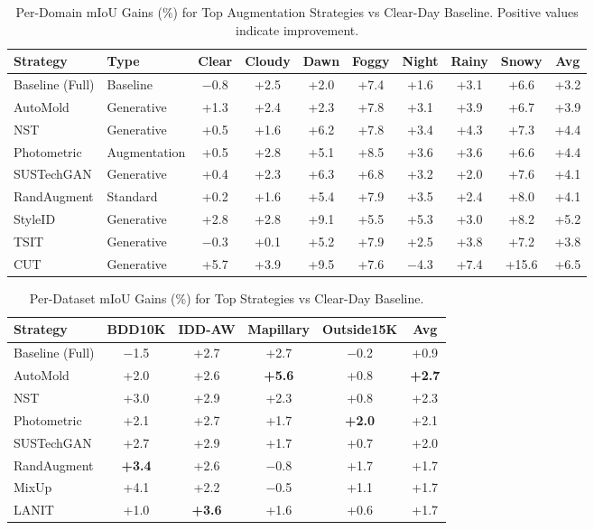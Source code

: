 \begin{table}[t]
\centering
\caption{Per-Domain mIoU Gains (\%) for Top Augmentation Strategies vs Clear-Day Baseline. Positive values indicate improvement.}
\label{tab:per_domain_gains}
\begin{tabular}{@{}llccccccc|c@{}}
\toprule
\textbf{Strategy} & \textbf{Type} & \textbf{Clear} & \textbf{Cloudy} & \textbf{Dawn} & \textbf{Foggy} & \textbf{Night} & \textbf{Rainy} & \textbf{Snowy} & \textbf{Avg} \\
\midrule
Baseline (Full) & Baseline & $-$0.8 & +2.5 & +2.0 & +7.4 & +1.6 & +3.1 & +6.6 & +3.2 \\
AutoMold & Generative & +1.3 & +2.4 & +2.3 & +7.8 & +3.1 & +3.9 & +6.7 & +3.9 \\
NST & Generative & +0.5 & +1.6 & +6.2 & +7.8 & +3.4 & +4.3 & +7.3 & +4.4 \\
Photometric & Augmentation & +0.5 & +2.8 & +5.1 & +8.5 & +3.6 & +3.6 & +6.6 & +4.4 \\
SUSTechGAN & Generative & +0.4 & +2.3 & +6.3 & +6.8 & +3.2 & +2.0 & +7.6 & +4.1 \\
RandAugment & Standard & +0.2 & +1.6 & +5.4 & +7.9 & +3.5 & +2.4 & +8.0 & +4.1 \\
StyleID & Generative & +2.8 & +2.8 & +9.1 & +5.5 & +5.3 & +3.0 & +8.2 & +5.2 \\
TSIT & Generative & $-$0.3 & +0.1 & +5.2 & +7.9 & +2.5 & +3.8 & +7.2 & +3.8 \\
CUT & Generative & +5.7 & +3.9 & +9.5 & +7.6 & $-$4.3 & +7.4 & +15.6 & +6.5 \\
\bottomrule
\end{tabular}
\end{table}



\begin{table}[t]
\centering
\caption{Per-Dataset mIoU Gains (\%) for Top Strategies vs Clear-Day Baseline.}
\label{tab:per_dataset_gains}
\begin{tabular}{@{}lcccc|c@{}}
\toprule
\textbf{Strategy} & \textbf{BDD10K} & \textbf{IDD-AW} & \textbf{Mapillary} & \textbf{Outside15K} & \textbf{Avg} \\
\midrule
Baseline (Full) & $-$1.5 & +2.7 & +2.7 & $-$0.2 & +0.9 \\
AutoMold & +2.0 & +2.6 & \textbf{+5.6} & +0.8 & \textbf{+2.7} \\
NST & +3.0 & +2.9 & +2.3 & +0.8 & +2.3 \\
Photometric & +2.1 & +2.7 & +1.7 & \textbf{+2.0} & +2.1 \\
SUSTechGAN & +2.7 & +2.9 & +1.7 & +0.7 & +2.0 \\
RandAugment & \textbf{+3.4} & +2.6 & $-$0.8 & +1.7 & +1.7 \\
MixUp & +4.1 & +2.2 & $-$0.5 & +1.1 & +1.7 \\
LANIT & +1.0 & \textbf{+3.6} & +1.6 & +0.6 & +1.7 \\
\bottomrule
\end{tabular}
\end{table}


